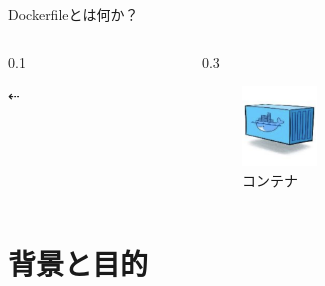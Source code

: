 \documentclass[dvipdfmx, 12pt]{beamer}
\newlength{\mytotalwidth}
\newlength{\mycolumnwidth}
\begin{document}
\begin{frame}{Dockerfileとは何か？}
\begin{columns}[totalwidth=\mytotalwidth]
\begin{column}[T]{0.1\mycolumnwidth}
            \centerline{$\dashleftarrow$}
        \end{column}
        \begin{column}[T]{0.3\mycolumnwidth}
            \begin{figure}
                \centering
                \includegraphics[height=60pt]{img/container.png}
                \caption{コンテナ}
            \end{figure}
        \end{column}
    \end{columns}
\end{frame}




\section{背景と目的}
\end{document}
